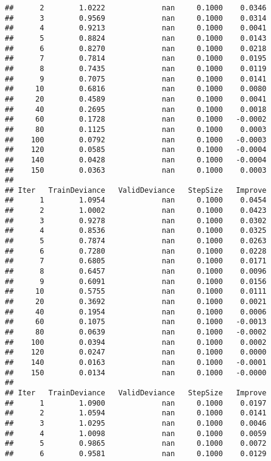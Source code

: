 \documentclass[]{article}
\begin{document}
\begin{verbatim}
##      2        1.0222             nan     0.1000    0.0346
##      3        0.9569             nan     0.1000    0.0314
##      4        0.9213             nan     0.1000    0.0041
##      5        0.8824             nan     0.1000    0.0143
##      6        0.8270             nan     0.1000    0.0218
##      7        0.7814             nan     0.1000    0.0195
##      8        0.7435             nan     0.1000    0.0119
##      9        0.7075             nan     0.1000    0.0141
##     10        0.6816             nan     0.1000    0.0080
##     20        0.4589             nan     0.1000    0.0041
##     40        0.2695             nan     0.1000    0.0018
##     60        0.1728             nan     0.1000   -0.0002
##     80        0.1125             nan     0.1000    0.0003
##    100        0.0792             nan     0.1000   -0.0003
##    120        0.0585             nan     0.1000   -0.0004
##    140        0.0428             nan     0.1000   -0.0004
##    150        0.0363             nan     0.1000    0.0003
## 
## Iter   TrainDeviance   ValidDeviance   StepSize   Improve
##      1        1.0954             nan     0.1000    0.0454
##      2        1.0002             nan     0.1000    0.0423
##      3        0.9278             nan     0.1000    0.0302
##      4        0.8536             nan     0.1000    0.0325
##      5        0.7874             nan     0.1000    0.0263
##      6        0.7280             nan     0.1000    0.0228
##      7        0.6805             nan     0.1000    0.0171
##      8        0.6457             nan     0.1000    0.0096
##      9        0.6091             nan     0.1000    0.0156
##     10        0.5755             nan     0.1000    0.0111
##     20        0.3692             nan     0.1000    0.0021
##     40        0.1954             nan     0.1000    0.0006
##     60        0.1075             nan     0.1000   -0.0013
##     80        0.0639             nan     0.1000   -0.0002
##    100        0.0394             nan     0.1000    0.0002
##    120        0.0247             nan     0.1000    0.0000
##    140        0.0163             nan     0.1000   -0.0001
##    150        0.0134             nan     0.1000   -0.0000
## 
## Iter   TrainDeviance   ValidDeviance   StepSize   Improve
##      1        1.0900             nan     0.1000    0.0197
##      2        1.0594             nan     0.1000    0.0141
##      3        1.0295             nan     0.1000    0.0046
##      4        1.0098             nan     0.1000    0.0059
##      5        0.9865             nan     0.1000    0.0072
##      6        0.9581             nan     0.1000    0.0129

\end{verbatim}
\end{document}
